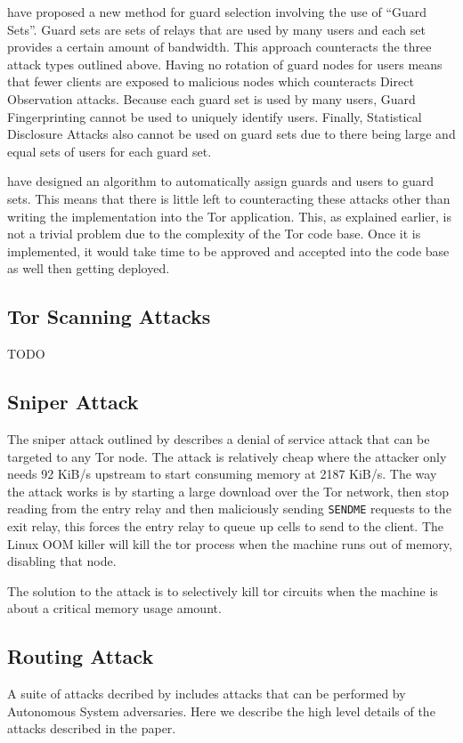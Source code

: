 \documentclass[9pt,technote]{IEEEtran}
\begin{document}
\citeauthor{hayesguard} have proposed a new method for guard selection involving the use of ``Guard Sets''. Guard sets are sets of relays that are used by many users and each set provides a certain amount of bandwidth. This approach counteracts the three attack types outlined above. Having no rotation of guard nodes for users means that fewer clients are exposed to malicious nodes which counteracts Direct Observation attacks. Because each guard set is used by many users, Guard Fingerprinting cannot be used to uniquely identify users. Finally, Statistical Disclosure Attacks also cannot be used on guard sets due to there being large and equal sets of users for each guard set.

\citeauthor{hayesguard} have designed an algorithm to automatically assign guards and users to guard sets. This means that there is little left to counteracting these attacks other than writing the implementation into the Tor application. This, as explained earlier, is not a trivial problem due to the complexity of the Tor code base. Once it is implemented, it would take time to be approved and accepted into the code base as well then getting deployed.

\subsection{Tor Scanning Attacks}
TODO

\subsection{Sniper Attack}
The sniper attack outlined by \citeauthor{jansen2014sniper} describes a denial
of service attack that can be targeted to any Tor node. The attack is relatively cheap where the attacker only needs 92 KiB/s upstream to start consuming memory at 2187 KiB/s. The way the attack works is by starting a large download over the Tor network, then stop reading from the entry relay and then maliciously sending \texttt{SENDME} requests to the exit relay, this forces the entry relay to queue up cells to send to the client. The Linux OOM killer will kill the tor process when the machine runs out of memory, disabling that node.

The solution to the attack is to selectively kill tor circuits when the machine
is about a critical memory usage amount.

\subsection{Routing Attack}
A suite of attacks decribed by \citeauthor{sun2015raptor} includes attacks that
can be performed by Autonomous System adversaries. Here we describe the high
level details of the attacks described in the paper.
\end{document}
